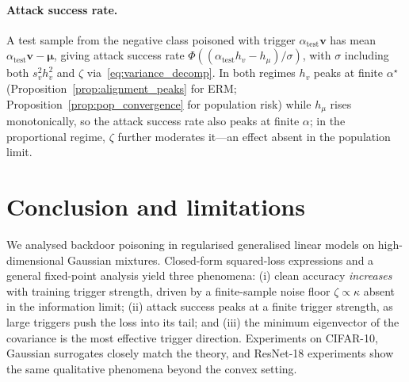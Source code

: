 \documentclass[11pt]{article}
\newcommand{\bv}{\mathbf{v}}
\newcommand{\bmu}{\boldsymbol{\mu}}
\begin{document}
\paragraph{Attack success rate.}
A test sample from the negative class poisoned with trigger $\alpha_{\mathrm{test}}\bv$ has mean $\alpha_{\mathrm{test}}\bv - \bmu$, giving attack success rate $\Phi((\alpha_{\mathrm{test}}h_v - h_\mu)/\sigma)$, with $\sigma$ including both $s_v^2 h_v^2$ and $\zeta$ via~\eqref{eq:variance_decomp}. In both regimes $h_v$ peaks at finite $\alpha^\star$ (Proposition~\ref{prop:alignment_peaks} for ERM; Proposition~\ref{prop:pop_convergence} for population risk) while $h_\mu$ rises monotonically, so the attack success rate also peaks at finite $\alpha$; in the proportional regime, $\zeta$ further moderates it---an effect absent in the population limit.


\section{Conclusion and limitations}
\label{sec:conclusion}


We analysed backdoor poisoning in regularised generalised linear models
on high-dimensional Gaussian mixtures. Closed-form squared-loss expressions
and a general fixed-point analysis yield three phenomena: (i) clean accuracy
\emph{increases} with training trigger strength, driven by a finite-sample
noise floor $\zeta \propto \kappa$ absent in the information limit;
(ii) attack success peaks at a finite trigger strength, as large triggers
push the loss into its tail; and (iii) the minimum
eigenvector of the covariance is the most effective trigger direction.
Experiments on CIFAR-10, Gaussian surrogates closely
match the theory, and ResNet-18 experiments show the same qualitative phenomena beyond the convex setting.
\end{document}
